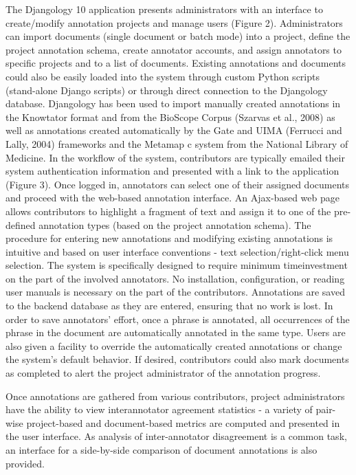 \begin{description}
    The Djangology 10 application presents administrators with
    an interface to create/modify annotation projects and manage users (Figure 2). Administrators can import documents
    (single document or batch mode) into a project, define the
    project annotation schema, create annotator accounts, and
    assign annotators to specific projects and to a list of documents. Existing annotations and documents could also be
    easily loaded into the system through custom Python scripts
    (stand-alone Django scripts) or through direct connection
    to the Djangology database. Djangology has been used to
    import manually created annotations in the Knowtator format and from the BioScope Corpus (Szarvas et al., 2008)
    as well as annotations created automatically by the Gate
    and UIMA (Ferrucci and Lally, 2004) frameworks and the
    Metamap c system from the National Library of Medicine.
    In the workflow of the system, contributors are typically
    emailed their system authentication information and presented with a link to the application (Figure 3). Once
    logged in, annotators can select one of their assigned documents and proceed with the web-based annotation interface.
    An Ajax-based web page allows contributors to highlight a
    fragment of text and assign it to one of the pre-defined annotation types (based on the project annotation schema).
    The procedure for entering new annotations and modifying
    existing annotations is intuitive and based on user interface
    conventions - text selection/right-click menu selection. The
    system is specifically designed to require minimum timeinvestment on the part of the involved annotators. No installation, configuration, or reading user manuals is necessary on the part of the contributors. Annotations are saved
    to the backend database as they are entered, ensuring that
    no work is lost. In order to save annotators’ effort, once a
    phrase is annotated, all occurrences of the phrase in the document are automatically annotated in the same type. Users
    are also given a facility to override the automatically created annotations or change the system’s default behavior. If
    desired, contributors could also mark documents as completed to alert the project administrator of the annotation
    progress.

    Once annotations are gathered from various contributors, project administrators have the ability to view interannotator agreement statistics - a variety of pair-wise
    project-based and document-based metrics are computed
    and presented in the user interface. As analysis of inter-annotator disagreement is a common task, an
    interface for a side-by-side comparison of document annotations is also provided.


\end{description}
